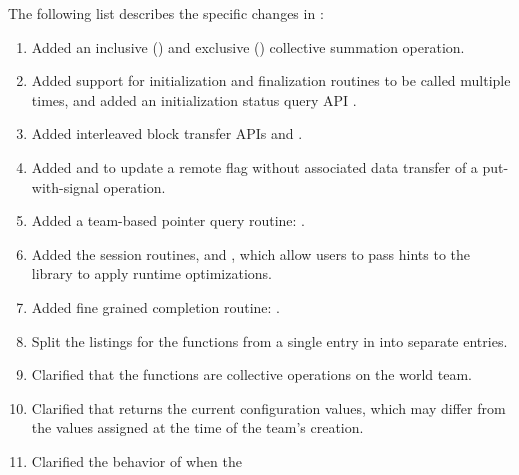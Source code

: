 The following list describes the specific changes in \openshmem[1.6]:
\begin{enumerate}
%
\item Added an inclusive () and exclusive 
() collective summation operation. 
%
\item Added support for initialization and finalization routines to be called
    multiple times, and added an initialization status query API
    .
%
%
\item Added interleaved block transfer APIs  and
    .
%
%
\item Added  and  to
  update a remote flag without associated data transfer of a put-with-signal operation.
%
%
\item Added a team-based pointer query routine:
  .
%
%
\item Added the session routines,  and
    , which allow users to pass hints to the
    \openshmem library to apply runtime optimizations.
%
\item Added fine grained completion routine: .
%
%
\item Split the listings for the 
  functions from a single entry in \openshmem[1.5] into separate entries.
%
%
\item Clarified that the  functions are collective operations on
    the world team.
%
%
\item Clarified that  returns the current
    configuration values, which may differ from the values assigned at the
        time of the team's creation.
%
\item Clarified the behavior of  when the

\end{enumerate}
